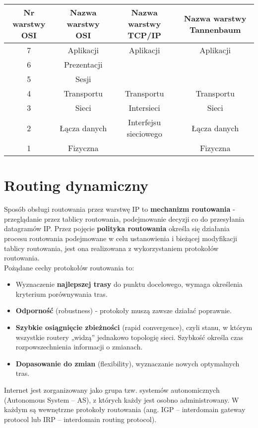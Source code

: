 \documentclass[a4paper]{article}
\begin{document}
\begin{tabular}{|c|c|c|c| }
\hline
Nr warstwy OSI & Nazwa warstwy OSI & Nazwa warstwy TCP/IP & Nazwa warstwy Tannenbaum\\
\hline
7 & Aplikacji & Aplikacji & Aplikacji\\
6 & Prezentacji & & \\
5 & Sesji & & \\
4 & Transportu & Transportu & Transportu\\
3 & Sieci & Intersieci & Sieci\\
2 & Łącza danych & Interfejsu sieciowego & Łącza danych\\
1 & Fizyczna & & Fizyczna\\
\hline
\end{tabular}

\section{Routing dynamiczny}
Sposób obsługi routowania przez warstwę IP to \textbf{mechanizm routowania} -
przeglądanie przez tablicy routowania, podejmowanie decyzji co do przesyłania datagramów IP.
Przez pojęcie \textbf{polityka routowania} określa się działania procesu routowania podejmowane w
celu ustanowienia i bieżącej modyfikacji tablicy routowania, jest ona realizowana z wykorzystaniem protokołów routowania.\\

Pożądane cechy protokołów routowania to:
\begin{itemize}
    \item Wyznaczenie \textbf{najlepszej trasy} do punktu docelowego, wymaga określenia kryterium porównywania tras.
    \item \textbf{Odporność} (robustness) - protokoły muszą zawsze działać poprawnie.
    \item \textbf{Szybkie osiągnięcie zbieżności} (rapid convergence), czyli stanu, w którym wszystkie routery „widzą” jednakowo topologię sieci.
Szybkość określa czas rozpowszechnienia informacji o zmianach.
    \item \textbf{Dopasowanie do zmian} (flexibility), wyznaczanie nowych optymalnych tras.
\end{itemize}

Internet jest zorganizowany jako grupa tzw. systemów autonomicznych (Autonomous
System – AS), z których każdy jest osobno administrowany. W każdym są wewnętrzne protokoły routowania (ang. IGP – interdomain gateway protocol lub IRP – interdomain routing protocol).\\
\end{document}
